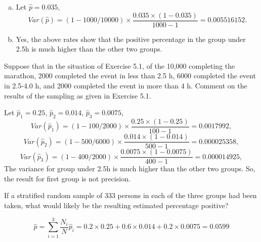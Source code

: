 \documentclass[12pt]{article}
\begin{document}
    \begin{solution}
        \begin{enumerate}[a. ]
            \item Let $\hat{p}=0.035$, 
            \[
                Var(\hat{p})=(1-1000/10000)\times\frac{0.035\times(1-0.035)}{1000-1}=0.005516152. 
            \]
            \item Yes, the above rates show that the positive percentage in the group under 2.5h is much higher than the other two groups. 
        \end{enumerate}
    \end{solution}

    \begin{exercise}[Levy-5.2]
        Suppose that in the situation of Exercise 5.1, of the 10,000 completing the marathon, 2000 completed the event in less than 2.5 h, 6000 completed the event in 2.5-4.0 h, and 2000 completed the event in more than 4 h. Comment on the results of the sampling as given in Exercise 5.1. 
    \end{exercise}

    \begin{solution}
        Let $\hat{p}_1=0.25$, $\hat{p}_2=0.014$, $\hat{p}_3=0.0075$, 
        \[
            Var(\hat{p}_1)=(1-100/2000)\times\frac{0.25\times(1-0.25)}{100-1}=0.0017992, 
        \]
        \[
            Var(\hat{p}_2)=(1-500/6000)\times\frac{0.014\times(1-0.014)}{500-1}=0.000025358, 
        \]
        \[
            Var(\hat{p}_3)=(1-400/2000)\times\frac{0.0075\times(1-0.0075)}{400-1}=0.000014925, 
        \]
        The variance for group under 2.5h is much higher than the other two groups. So, the result for first group is not precision. 
    \end{solution}

    \begin{exercise}[Levy-5.3]
        If a stratified random sample of 333 persons in each of the three groups had been taken, what would likely be the resulting estimated percentage positive? 
    \end{exercise}

    \begin{solution}
        \[
            \hat{p}=\sum_{i=1}^3\frac{N_i}{N}\hat{p}_i=0.2\times 0.25+0.6\times 0.014+0.2\times0.0075=0.0599
        \]
    \end{solution}
\end{document}

